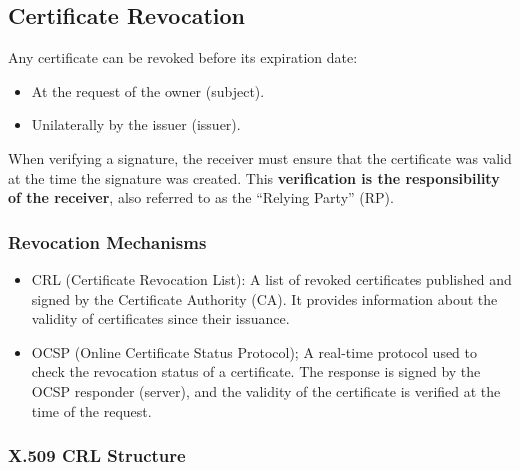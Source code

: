 \subsection{Certificate Revocation}
Any certificate can be revoked before its expiration date:
\begin{itemize}
\item At the request of the owner (subject).
\item Unilaterally by the issuer (issuer).
\end{itemize}
When verifying a signature, the receiver must ensure that the certificate was valid at the time the signature was created. This \textbf{verification is the responsibility of the receiver}, also referred to as the “Relying Party” (RP).

\subsubsection*{Revocation Mechanisms}
\begin{itemize}
    \item CRL (Certificate Revocation List):
    A list of revoked certificates published and signed by the Certificate Authority (CA). It provides information about the validity of certificates since their issuance.
    \item OCSP (Online Certificate Status Protocol);  
A real-time protocol used to check the revocation status of a certificate. The response is signed by the OCSP responder (server), and the validity of the certificate is verified at the time of the request.  
\end{itemize}

\subsubsection*{X.509 CRL Structure}

